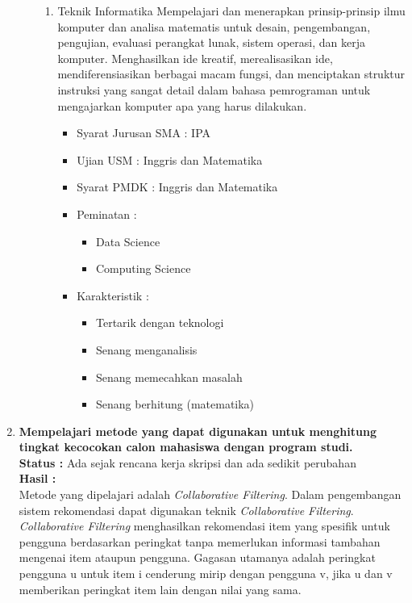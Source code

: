 \documentclass[a4paper,twoside]{article}
\begin{document}
\begin{enumerate}
\begin{enumerate}
\begin{enumerate}
				\item Teknik Informatika
					Mempelajari dan menerapkan prinsip-prinsip ilmu komputer dan analisa matematis untuk desain, pengembangan, pengujian, evaluasi perangkat lunak, sistem operasi, dan kerja komputer. Menghasilkan ide kreatif, merealisasikan ide, mendiferensiasikan berbagai macam fungsi, dan menciptakan struktur instruksi yang sangat detail dalam bahasa pemrograman untuk mengajarkan komputer apa yang harus dilakukan.
					\begin{itemize}
						\item Syarat Jurusan SMA : IPA
						\item Ujian USM : Inggris dan Matematika
						\item Syarat PMDK : Inggris dan Matematika
						\item Peminatan :
						\begin{itemize}
							\item Data Science
							\item Computing Science
						\end{itemize}
						\item Karakteristik :
						\begin{itemize}
							\item Tertarik dengan teknologi
							\item Senang menganalisis
							\item Senang memecahkan masalah
							\item Senang berhitung (matematika)
						\end{itemize}
					\end{itemize}
			\end{enumerate}
		\end{enumerate}

		\item \textbf{Mempelajari metode yang dapat digunakan untuk menghitung tingkat kecocokan calon mahasiswa dengan program studi.}\\
		{\bf Status :} Ada sejak rencana kerja skripsi dan ada sedikit perubahan\\
		{\bf Hasil :} \\
		Metode yang dipelajari adalah \textit{Collaborative Filtering}. Dalam pengembangan sistem rekomendasi dapat digunakan teknik \textit{Collaborative Filtering}. \textit{Collaborative Filtering} menghasilkan rekomendasi item yang spesifik untuk pengguna berdasarkan peringkat tanpa memerlukan informasi tambahan mengenai item ataupun pengguna. Gagasan utamanya adalah peringkat pengguna u untuk item i cenderung mirip dengan pengguna v, jika u dan v memberikan peringkat item lain dengan nilai yang sama. %
	

\end{enumerate}
\end{document}
